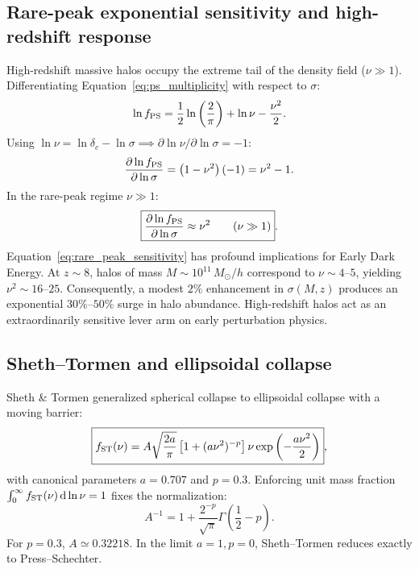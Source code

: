\documentclass[11pt]{article}
\newcommand{\dd}{\,\mathrm d}
\newcommand{\Msun}{M_\odot}
\begin{document}
\subsection{Rare-peak exponential sensitivity and high-redshift response}
High-redshift massive halos occupy the extreme tail of the density field ($\nu \gg 1$). Differentiating Equation~\eqref{eq:ps_multiplicity} with respect to $\sigma$:
\begin{equation}
\ln f_{\rm PS} = \frac{1}{2}\ln\left(\frac{2}{\pi}\right) + \ln\nu - \frac{\nu^2}{2}.
\end{equation}
Using $\ln\nu = \ln\delta_c - \ln\sigma \implies \partial\ln\nu/\partial\ln\sigma = -1$:
\begin{equation}
\frac{\partial\ln f_{\rm PS}}{\partial\ln\sigma} = \left(1 - \nu^2\right)(-1) = \nu^2 - 1.
\end{equation}
In the rare-peak regime $\nu \gg 1$:
\begin{equation}
\boxed{\frac{\partial\ln f_{\rm PS}}{\partial\ln\sigma} \approx \nu^2 \qquad (\nu \gg 1)}.
\label{eq:rare_peak_sensitivity}
\end{equation}
Equation~\eqref{eq:rare_peak_sensitivity} has profound implications for Early Dark Energy. At $z \sim 8$, halos of mass $M \sim 10^{11}\,\Msun/h$ correspond to $\nu \sim 4\text{--}5$, yielding $\nu^2 \sim 16\text{--}25$. Consequently, a modest $2\%$ enhancement in $\sigma(M,z)$ produces an exponential $30\%\text{--}50\%$ surge in halo abundance. High-redshift halos act as an extraordinarily sensitive lever arm on early perturbation physics.

\subsection{Sheth--Tormen and ellipsoidal collapse}
Sheth \& Tormen \cite{ShethTormen1999} generalized spherical collapse to ellipsoidal collapse with a moving barrier:
\begin{equation}
\boxed{f_{\rm ST}(\nu) = A\sqrt{\frac{2a}{\pi}}\left[ 1 + (a\nu^2)^{-p} \right]\nu\exp\left( -\frac{a\nu^2}{2} \right)},
\end{equation}
with canonical parameters $a = 0.707$ and $p = 0.3$. Enforcing unit mass fraction $\int_0^\infty f_{\rm ST}(\nu)\dd\ln\nu = 1$ fixes the normalization:
\begin{equation}
\boxed{A^{-1} = 1 + \frac{2^{-p}}{\sqrt\pi}\Gamma\left(\frac{1}{2} - p\right)}.
\end{equation}
For $p = 0.3$, $A \simeq 0.32218$. In the limit $a = 1, p = 0$, Sheth--Tormen reduces exactly to Press--Schechter.
\end{document}
